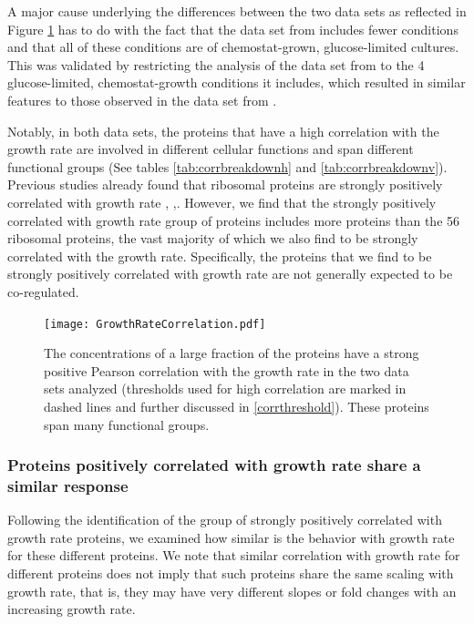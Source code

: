 \documentclass[notitlepage]{article}
\begin{document}
A major cause underlying the differences between the two data sets as reflected in Figure \ref{fig:growthcorr} has to do with the fact that the data set from \cite{Valgepea2013} includes fewer conditions and that all of these conditions are of chemostat-grown, glucose-limited cultures.
This was validated by restricting the analysis of the data set from \cite{Heinemann2014} to the 4 glucose-limited, chemostat-growth conditions it includes, which resulted in similar features to those observed in the data set from \cite{Valgepea2013}.

Notably, in both data sets, the proteins that have a high correlation with the growth rate are involved in different cellular functions and span different functional groups (See tables \ref{tab:corrbreakdownh} and \ref{tab:corrbreakdownv}).
Previous studies already found that ribosomal proteins are strongly positively correlated with growth rate \cite{Pedersen1978a}, \cite{ingraham1983growth},\cite{Klumpp2008}.
However, we find that the strongly positively correlated with growth rate group of proteins includes more proteins than the 56 ribosomal proteins, the vast majority of which we also find to be strongly correlated with the growth rate.
Specifically, the proteins that we find to be strongly positively correlated with growth rate are not generally expected to be co-regulated.

\begin{figure}[h]
\centering
\texttt{[image: GrowthRateCorrelation.pdf]}
\caption{
The concentrations of a large fraction of the proteins have a strong positive Pearson correlation with the growth rate in the two data sets analyzed (thresholds used for high correlation are marked in dashed lines and further discussed in \ref{corrthreshold}).
These proteins span many functional groups.
}
\label{fig:growthcorr}
\end{figure}
\subsubsection{Proteins positively correlated with growth rate share a similar response}
\label{propchange}
Following the identification of the group of strongly positively correlated with growth rate proteins, we examined how similar is the behavior with growth rate for these different proteins.
We note that similar correlation with growth rate for different proteins does not imply that such proteins share the same scaling with growth rate, that is,  they may have very different slopes or fold changes with an increasing growth rate.
\end{document}
